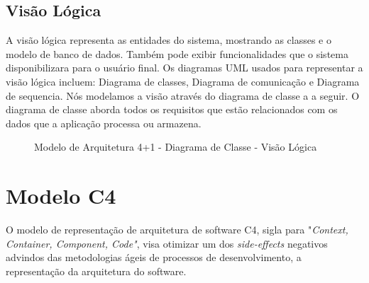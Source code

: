 \documentclass[12pt]{article}
\begin{document}
\vfill%
\pagebreak%

\subsection{Visão Lógica}

A visão lógica representa as entidades do sistema, mostrando as classes e o modelo de banco de dados. Também pode exibir funcionalidades que o sistema disponibilizara para o usuário final. Os diagramas UML usados para representar a visão lógica incluem: Diagrama de classes, Diagrama de comunicação e Diagrama de sequencia.
Nós modelamos a visão através do diagrama de classe a a seguir. O diagrama de classe aborda todos os requisitos que estão relacionados com os dados que a aplicação processa ou armazena.

\begin{figure}[!h]
    \caption{\label{fig:DiagClasse} Modelo de Arquitetura 4+1 - Diagrama de Classe - Visão Lógica}
\end{figure}

\vfill%
\pagebreak%

\section{Modelo C4}
O modelo de representação de arquitetura de software C4, sigla para "\textit{Context, Container, Component, Code"}, visa otimizar um dos \textit{side-effects} negativos advindos das metodologias ágeis de processos de desenvolvimento, a representação da arquitetura do software. 
\end{document}
